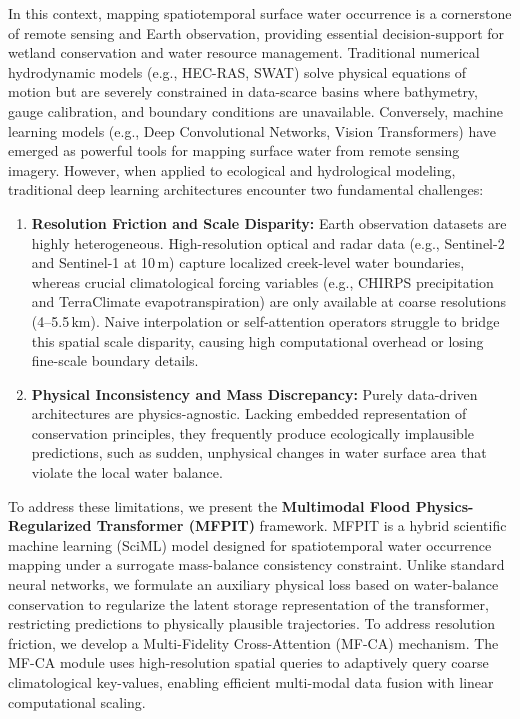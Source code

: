 \documentclass[journal]{IEEEtran}
\begin{document}
In this context, mapping spatiotemporal surface water occurrence is a cornerstone of remote sensing and Earth observation, providing essential decision-support for wetland conservation and water resource management. Traditional numerical hydrodynamic models (e.g., HEC-RAS, SWAT) solve physical equations of motion but are severely constrained in data-scarce basins where bathymetry, gauge calibration, and boundary conditions are unavailable. Conversely, machine learning models (e.g., Deep Convolutional Networks, Vision Transformers) have emerged as powerful tools for mapping surface water from remote sensing imagery. However, when applied to ecological and hydrological modeling, traditional deep learning architectures encounter two fundamental challenges:
\begin{enumerate}
    \item \textbf{Resolution Friction and Scale Disparity:} Earth observation datasets are highly heterogeneous. High-resolution optical and radar data (e.g., Sentinel-2 and Sentinel-1 at 10\,m) capture localized creek-level water boundaries, whereas crucial climatological forcing variables (e.g., CHIRPS precipitation and TerraClimate evapotranspiration) are only available at coarse resolutions (4--5.5\,km). Naive interpolation or self-attention operators struggle to bridge this spatial scale disparity, causing high computational overhead or losing fine-scale boundary details.
    \item \textbf{Physical Inconsistency and Mass Discrepancy:} Purely data-driven architectures are physics-agnostic. Lacking embedded representation of conservation principles, they frequently produce ecologically implausible predictions, such as sudden, unphysical changes in water surface area that violate the local water balance.
\end{enumerate}

To address these limitations, we present the \textbf{Multimodal Flood Physics-Regularized Transformer (MFPIT)} framework. MFPIT is a hybrid scientific machine learning (SciML) model designed for spatiotemporal water occurrence mapping under a surrogate mass-balance consistency constraint. Unlike standard neural networks, we formulate an auxiliary physical loss based on water-balance conservation to regularize the latent storage representation of the transformer, restricting predictions to physically plausible trajectories. To address resolution friction, we develop a Multi-Fidelity Cross-Attention (MF-CA) mechanism. The MF-CA module uses high-resolution spatial queries to adaptively query coarse climatological key-values, enabling efficient multi-modal data fusion with linear computational scaling.
\end{document}
